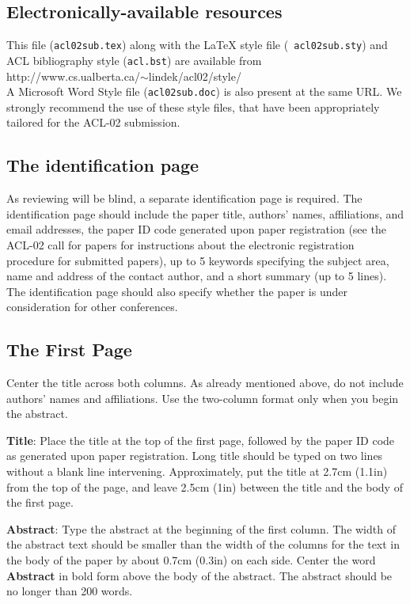\documentclass[11pt]{article}
\begin{document}
\subsection{Electronically-available resources}

This file ({\tt acl02sub.tex}) along with the LaTeX style file ({\tt
  acl02sub.sty}) and ACL bibliography style ({\tt acl.bst}) are
available from\\
http://www.cs.ualberta.ca/$\sim$lindek/acl02/style/\\
A
Microsoft Word Style file ({\tt acl02sub.doc}) is also present at the
same URL.  We strongly recommend the use of these style files, that
have been appropriately tailored for the ACL-02 submission.


\subsection{The identification page}

As reviewing will be blind, a separate identification page is required.
The identification page should include the paper title, authors' names,
affiliations, and email addresses, the paper ID code generated upon
paper registration (see the ACL-02 call for papers for instructions
about the electronic registration procedure for submitted papers), up to
5 keywords specifying the subject area, name and address of the contact
author, and a short summary (up to 5 lines).  The identification page
should also specify whether the paper is under consideration for other
conferences.



\subsection{The First Page}

Center the title across both columns.  As already mentioned above,
do not include authors' names and affiliations.  Use the
two-column format only when you begin the abstract.

{\bf Title}: Place the title at the top of the first page, followed by
the paper ID code as generated upon paper registration.  Long title
should be typed on two lines without a blank line
intervening. Approximately, put the title at 2.7cm (1.1in) from the top
of the page, and leave 2.5cm (1in) between the title and the body of the
first page.

{\bf Abstract}: Type the abstract at the beginning of the first column.
The width of the abstract text should be smaller than the width of the
columns for the text in the body of the paper by about 0.7cm (0.3in) on
each side.  Center the word {\bf Abstract} in bold form above the body
of the abstract. The abstract should be no longer than 200 words.
\end{document}
